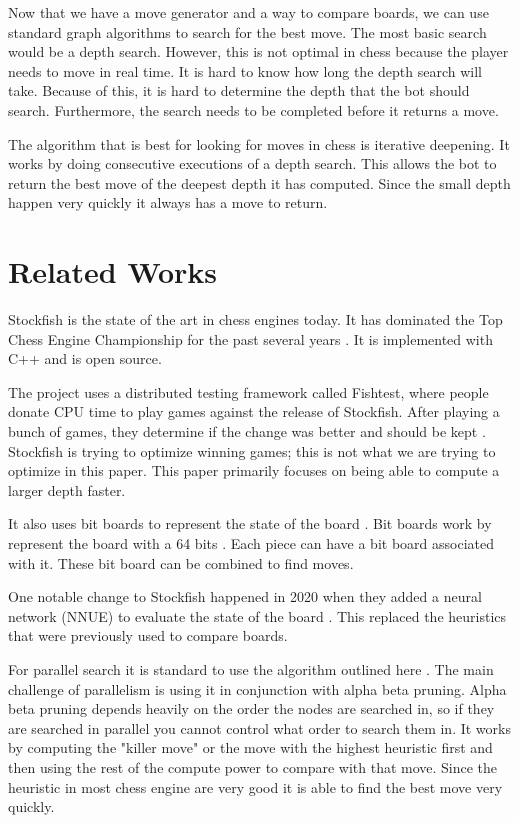 \documentclass[sigconf]{acmart}
\begin{document}
Now that we have a move generator and a way to compare boards, we can use standard graph algorithms to search for the best move.
The most basic search would be a depth search.
However, this is not optimal in chess because the player needs to move in real time.
It is hard to know how long the depth search will take.
Because of this, it is hard to determine the depth that the bot should search.
Furthermore, the search needs to be completed before it returns a move.

The algorithm that is best for looking for moves in chess is iterative deepening.
It works by doing consecutive executions of a depth search.
This allows the bot to return the best move of the deepest depth it has computed.
Since the small depth happen very quickly it always has a move to return.

\section{Related Works}
Stockfish \cite{stockfish} is the state of the art in chess engines today.
It has dominated the Top Chess Engine Championship for the past several years \cite{stockwiki}.
It is implemented with C++ and is open source.

The project uses a distributed testing framework called Fishtest, where people donate CPU time to play games against the release of Stockfish.
After playing a bunch of games, they determine if the change was better and should be kept \cite{stockwiki}.
Stockfish is trying to optimize winning games; this is not what we are trying to optimize in this paper.
This paper primarily focuses on being able to compute a larger depth faster.

It also uses bit boards to represent the state of the board \cite{stockwiki}.
Bit boards work by represent the board with a 64 bits \cite{bitboard}.
Each piece can have a bit board associated with it.
These bit board can be combined to find moves.

One notable change to Stockfish happened in 2020 when they added a neural network (NNUE) to evaluate the state of the board \cite{chesswiki}.
This replaced the heuristics that were previously used to compare boards.

For parallel search it is standard to use the algorithm outlined here \cite{parallel}.
The main challenge of parallelism is using it in conjunction with alpha beta pruning.
Alpha beta pruning depends heavily on the order the nodes are searched in, so if they are searched in parallel you cannot control what order to search them in.
It works by computing the "killer move" or the move with the highest heuristic first and then using the rest of the compute power to compare with that move.
Since the heuristic in most chess engine are very good it is able to find the best move very quickly.
\end{document}
